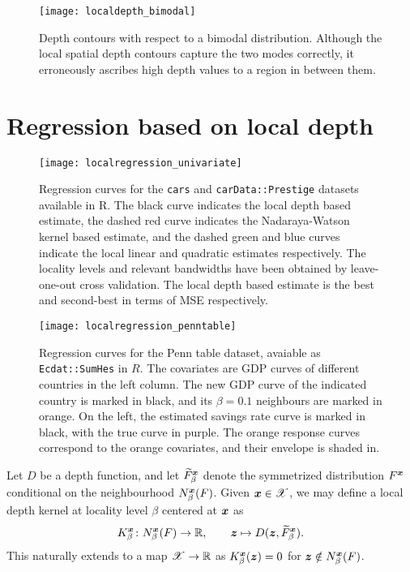 \begin{figure}
    \centering
    \texttt{[image: localdepth\_bimodal]}
    \caption{
        Depth contours with respect to a bimodal distribution.
        Although the local spatial depth contours capture the two modes
        correctly, it erroneously ascribes high depth values to a region in
        between them.
    }
    \label{fig:localdepth_bimodal}
\end{figure}


\section{Regression based on local depth}

\begin{figure}
    \centering
    \texttt{[image: localregression\_univariate]}
    \caption{
        Regression curves for the \texttt{cars} and \texttt{carData::Prestige}
        datasets available in R.
        The black curve indicates the local depth based estimate, the dashed
        red curve indicates the Nadaraya-Watson kernel based estimate, and the
        dashed green and blue curves indicate the local linear and quadratic
        estimates respectively.
        The locality levels and relevant bandwidths have been obtained by
        leave-one-out cross validation.
        The local depth based estimate is the best and second-best in terms of
        MSE respectively.
    }
    \label{fig:localregression_univariate}
\end{figure}


\begin{figure}
    \centering
    \texttt{[image: localregression\_penntable]}
    \caption{
        Regression curves for the Penn table dataset, avaiable as
        \texttt{Ecdat::SumHes} in $R$.
        The covariates are GDP curves of different countries in the left
        column.
        The new GDP curve of the indicated country is marked in black, and its
        $\beta = 0.1$ neighbours are marked in orange.
        On the left, the estimated savings rate curve is marked in black, with
        the true curve in purple.
        The orange response curves correspond to the orange covariates, and
        their envelope is shaded in.
    }
    \label{fig:localregression_penn}
\end{figure}


\begin{definition}
    Let $D$ be a depth function, and let $\widetilde{F}^{\bm{x}}_\beta$ denote
    the symmetrized distribution $F^{\bm{x}}$ conditional on the neighbourhood
    $N^{\bm{x}}_\beta(F)$.
    Given $\bm{x} \in \mathscr{X}$, we may define a local depth kernel at
    locality level $\beta$ centered at $\bm{x}$ as
    \begin{equation}
        K^{\bm{x}}_\beta\colon N^{\bm{x}}_\beta(F) \to \mathbb{R}, \qquad
        \bm{z} \mapsto D(\bm{z}, \widetilde{F}^{\bm{x}}_\beta).
    \end{equation}
    This naturally extends to a map $\mathscr{X} \to \mathbb{R}$ as
    $K^{\bm{x}}_\beta(\bm{z}) = 0$ for $\bm{z} \notin N^{\bm{x}}_\beta(F)$.
\end{definition}

